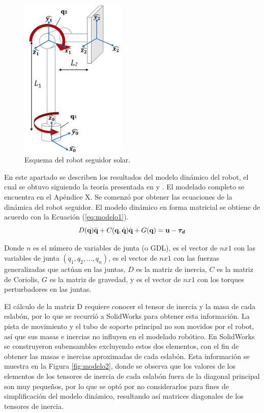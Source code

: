 \begin{figure}[H]
	\centering
	\includegraphics[width=5cm]{imagenes/modelo1}
	\caption{Esquema del robot seguidor solar.}
	\label{fig:modelo1}
\end{figure}

En este apartado se describen los resultados del modelo dinámico del robot, el cual se obtuvo siguiendo la teoría presentada en \cite{DDA11} y \cite{DDA12}. El modelado completo se encuentra en el Apéndice X. Se comenzó por obtener las ecuaciones de la dinámica del robot seguidor. El modelo dinámico en forma matricial se obtiene de acuerdo con la Ecuación (\ref{eq:modelo1}).
\begin{equation} \label{eq:modelo1}
    D(\textbf{q})\Ddot{\textbf{q}}+C(\textbf{q},\Dot{\textbf{q}})\Dot{\textbf{q}}+G(\textbf{q})=\textbf{u}-\bm{\tau_d}
\end{equation}

Donde $ n $ es el número de variables de junta (o GDL),  es el vector de $ nx1 $ con las variables de junta $ ( q_1,q_2,…,q_n ) $,  es el vector de $ nx1 $ con las fuerzas generalizadas que actúan en las juntas, $ D $ es la matriz de inercia, $ C $ es la matriz de Coriolis, $ G $ es la matriz de gravedad, y  es el vector de $ nx1 $ con los torques perturbadores en las juntas.

El cálculo de la matriz D requiere conocer el tensor de inercia y la masa de cada eslabón, por lo que se recurrió a SolidWorks para obtener esta información. La pista de movimiento y el tubo de soporte principal no son movidos por el robot, así que sus masas e inercias no influyen en el modelado robótico. En SolidWorks se construyeron subensambles excluyendo estos dos elementos, con el fin de obtener las masas e inercias aproximadas de cada eslabón. Esta información se muestra en la Figura \ref{fig:modelo2}, donde se observa que los valores de los elementos de los tensores de inercia de cada eslabón fuera de la diagonal principal son muy pequeños, por lo que se optó por no considerarlos para fines de simplificación del modelo dinámico, resultando así matrices diagonales de los tensores de inercia.

